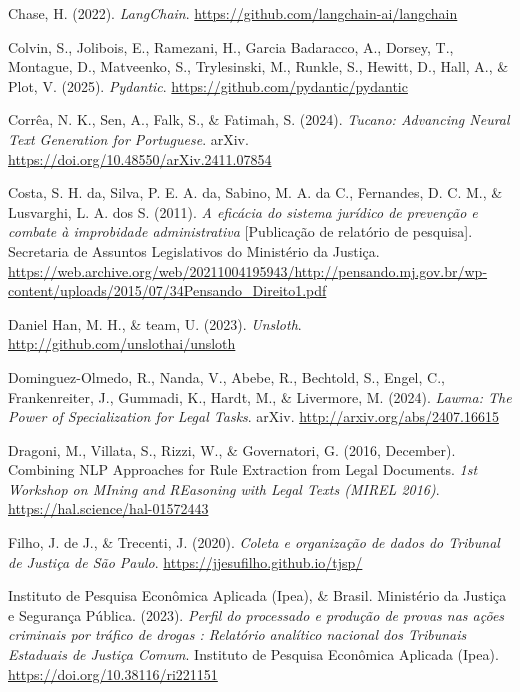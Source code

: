 \documentclass[
  12pt,
]{article}
\newlength{\cslhangindent}
\newenvironment{CSLReferences}[2] %
 {\begin{list}{}{%
  \setlength{\itemindent}{0pt}
  \setlength{\leftmargin}{0pt}
  \setlength{\parsep}{0pt}
  \ifodd #1
   \setlength{\leftmargin}{\cslhangindent}
   \setlength{\itemindent}{-1\cslhangindent}
  \fi
  \setlength{\itemsep}{#2\baselineskip}}}
 {\end{list}}
\begin{document}
\begin{CSLReferences}{1}{0}
Chase, H. (2022). \emph{{LangChain}}.
\url{https://github.com/langchain-ai/langchain}

Colvin, S., Jolibois, E., Ramezani, H., Garcia Badaracco, A., Dorsey,
T., Montague, D., Matveenko, S., Trylesinski, M., Runkle, S., Hewitt,
D., Hall, A., \& Plot, V. (2025). \emph{Pydantic}.
\url{https://github.com/pydantic/pydantic}

Corrêa, N. K., Sen, A., Falk, S., \& Fatimah, S. (2024). \emph{Tucano:
{Advancing} {Neural} {Text} {Generation} for {Portuguese}}. arXiv.
\url{https://doi.org/10.48550/arXiv.2411.07854}

Costa, S. H. da, Silva, P. E. A. da, Sabino, M. A. da C., Fernandes, D.
C. M., \& Lusvarghi, L. A. dos S. (2011). \emph{A eficácia do sistema
jurídico de prevenção e combate à improbidade administrativa}
{[}Publicação de relatório de pesquisa{]}. Secretaria de Assuntos
Legislativos do Ministério da Justiça.
\url{https://web.archive.org/web/20211004195943/http://pensando.mj.gov.br/wp-content/uploads/2015/07/34Pensando_Direito1.pdf}

Daniel Han, M. H., \& team, U. (2023). \emph{Unsloth}.
\url{http://github.com/unslothai/unsloth}

Dominguez-Olmedo, R., Nanda, V., Abebe, R., Bechtold, S., Engel, C.,
Frankenreiter, J., Gummadi, K., Hardt, M., \& Livermore, M. (2024).
\emph{Lawma: {The} {Power} of {Specialization} for {Legal} {Tasks}}.
arXiv. \url{http://arxiv.org/abs/2407.16615}

Dragoni, M., Villata, S., Rizzi, W., \& Governatori, G. (2016,
December). Combining {NLP} {Approaches} for {Rule} {Extraction} from
{Legal} {Documents}. \emph{1st {Workshop} on {MIning} and {REasoning}
with {Legal} Texts ({MIREL} 2016)}.
\url{https://hal.science/hal-01572443}

Filho, J. de J., \& Trecenti, J. (2020). \emph{Coleta e organização de
dados do {Tribunal} de {Justiça} de {São} {Paulo}}.
\url{https://jjesufilho.github.io/tjsp/}

Instituto de Pesquisa Econômica Aplicada (Ipea), \& Brasil. Ministério
da Justiça e Segurança Pública. (2023). \emph{Perfil do processado e
produção de provas nas ações criminais por tráfico de drogas : Relatório
analítico nacional dos {Tribunais} {Estaduais} de {Justiça} {Comum}}.
Instituto de Pesquisa Econômica Aplicada (Ipea).
\url{https://doi.org/10.38116/ri221151}


\end{CSLReferences}
\end{document}
